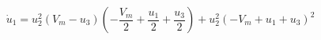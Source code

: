 $$
\dot u_1 = u_2^{2} \left(V_m - u_3\right) \left(- \frac{V_m}{2} + \frac{u_1}{2} + \frac{u_3}{2}\right) + u_2^{2} \left(- V_m + u_1 + u_3\right)^{2}
$$
